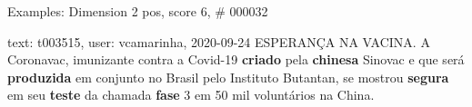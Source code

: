 \begin{frame}{Examples: Dimension 2 pos, score 6, \# 000032}
\footnotesize
\begin{exampleblock}{text: t003515, user: vcamarinha, 2020-09-24}
ESPERANÇA NA VACINA. A Coronavac, imunizante contra a Covid-19 \textbf{criado} 
pela \textbf{chinesa} Sinovac e que será \textbf{produzida} em conjunto no 
Brasil pelo Instituto Butantan, se mostrou \textbf{segura} em seu 
\textbf{teste} da chamada \textbf{fase} 3 em 50 mil voluntários na China. 
\end{exampleblock}
\end{frame}
